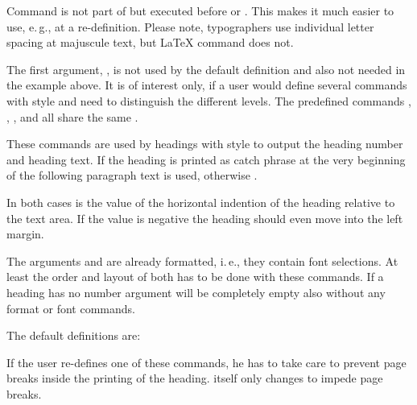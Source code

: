 Command  is not part of  but
executed before  or
. This makes it much easier to use, e.\,g.,
 at a re-definition. Please note, typographers use
individual letter spacing at majuscule text, but \LaTeX{} command
 does not.

The first argument, , is not used by the default definition and
also not needed in the example above. It is of interest only, if a user would
define several commands with  style and need to distinguish
the different levels. The predefined commands ,
, , and
 all share the same 
.%
\EndIndexGroup


\begin{Declaration}
\end{Declaration}
These commands are used by headings with style 
to output the heading number and heading text. If the heading is printed as
catch phrase at the very beginning of the following paragraph text
 is used, otherwise
.

In both cases  is the value of the horizontal indention of the
heading relative to the text area. If the value is negative the heading should
even move into the left margin.

The arguments  and  are already formatted, i.\,e.,
they contain font selections. At least the order and layout of both has to be
done with these commands. If a heading has no number argument 
will be completely empty also without any format or font commands.

The default definitions are:
\begin{lstcode}
\newcommand{\sectionlinesformat}[4]{%
  \@hangfrom{\hskip #2#3}{#4}%
}
\newcommand{\sectioncatchphraseformat}[4]{%
  \hskip #2#3#4%
}
\end{lstcode}

If the user re-defines one of these commands, he has to take care to prevent
page breaks inside the printing of the heading. \KOMAScript{} itself only
changes  to impede page breaks.

